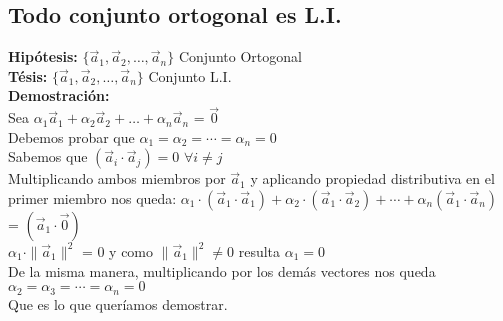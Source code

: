 \documentclass{article}
\begin{document}
\subsection{Todo conjunto ortogonal es L.I.}
\textbf{Hipótesis:} $\{\vec{a}_1, \vec{a}_2, \hdots, \vec{a}_n\}$ Conjunto Ortogonal \\
\textbf{Tésis:} $\{\vec{a}_1, \vec{a}_2, \hdots, \vec{a}_n\}$ Conjunto L.I.\\
\textbf{Demostración:} \\
Sea $\alpha_1\vec{a}_1 + \alpha_2\vec{a}_2 + \hdots + \alpha_n\vec{a}_n$ = $\vec{0}$ \\Debemos probar que $\alpha_1=\alpha_2=\cdots=\alpha_n=0$ \\
Sabemos que $(\vec{a}_i\cdot\vec{a}_j) = 0$ $\forall i \neq j$\\
Multiplicando ambos miembros por $\vec{a}_1$ y aplicando propiedad distributiva en el primer miembro nos queda: 
$\alpha_1\cdot(\vec{a}_1\cdot\vec{a}_1) + \alpha_2\cdot(\vec{a}_1\cdot\vec{a}_2) + \cdots + \alpha_n(\vec{a}_1\cdot\vec{a}_n)$ = $(\vec{a}_1\cdot\vec{0})$\\
$\alpha_1\cdot\parallel\vec{a}_1\parallel^2$ = $0$ y como $\parallel\vec{a}_1\parallel^2 \neq 0$ resulta $\alpha_1 = 0$\\
De la misma manera, multiplicando por los demás vectores nos queda $\alpha_2=\alpha_3=\cdots=\alpha_n=0$\\
Que es lo que queríamos demostrar.
\end{document}
